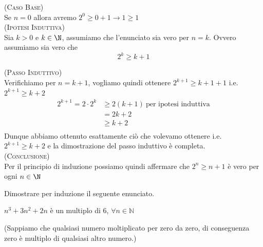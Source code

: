 \begin{soluzione}
\textsc{(Caso Base)}\\
Se $n=0$ allora avremo $2^0\geq 0+1\rightarrow 1\geq 1$\\

\textsc{(Ipotesi Induttiva)}\\
Sia $k>0$ e $k\in\N$, assumiamo che l'enunciato sia vero per $n=k$. Ovvero assumiamo sia vero che $$2^k\geq k+1$$

\textsc{(Passo Induttivo)}\\
Verifichiamo per $n=k+1$, vogliamo quindi ottenere $2^{k+1}\geq k+1+1$ i.e. $2^{k+1}\geq k+2$
\begin{align*}
2^{k+1}=2\cdot 2^k&\geq 2(k+1)\ \text{per ipotesi induttiva}\\
&=2k+2\\
&\geq k+2\\
\end{align*}
Dunque abbiamo ottenuto esattamente ciò che volevamo ottenere i.e. $2^{k+1}\geq k+2$ e la dimostrazione del passo induttivo è completa.
\\

\textsc{(Conclusione)}\\
Per il principio di induzione possiamo quindi affermare che $2^n\geq n+1$ è vero per ogni $n\in\N$\\
\end{soluzione}


\begin{esercizio}
Dimostrare per induzione il seguente enunciato.  
\begin{center}
    $ n^3 + 3n^2 + 2n$ è un multiplo di 6, $\forall n \in \mathbb{N}$
\end{center}
	
(Sappiamo che qualsiasi numero moltiplicato per zero da zero, di conseguenza zero è multiplo di qualsiasi altro numero.)\\
\end{esercizio}

